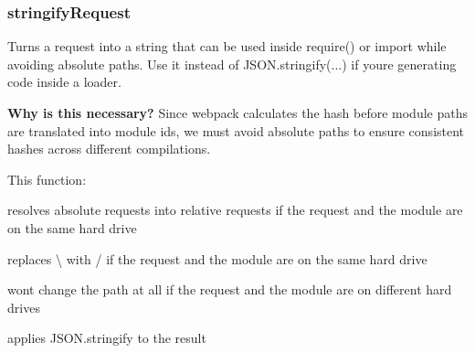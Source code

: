 \subsubsection*{{\ttfamily stringify\+Request}}

Turns a request into a string that can be used inside {\ttfamily require()} or {\ttfamily import} while avoiding absolute paths. Use it instead of {\ttfamily J\+S\+O\+N.\+stringify(...)} if you\textquotesingle{}re generating code inside a loader.

{\bfseries Why is this necessary?} Since webpack calculates the hash before module paths are translated into module ids, we must avoid absolute paths to ensure consistent hashes across different compilations.

This function\+:


\begin{DoxyItemize}
\item resolves absolute requests into relative requests if the request and the module are on the same hard drive
\item replaces {\ttfamily \textbackslash{}} with {\ttfamily /} if the request and the module are on the same hard drive
\item won\textquotesingle{}t change the path at all if the request and the module are on different hard drives
\item applies {\ttfamily J\+S\+O\+N.\+stringify} to the result
\end{DoxyItemize}


